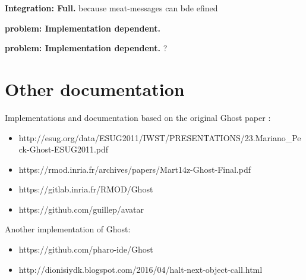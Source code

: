 \documentclass[10pt,twoside,english]{_support/latex/sbabook/sbabook}
\begin{document}
\textbf{Integration: Full.} because meat-messages can bde efined

\textbf{ problem: Implementation dependent.}

\textbf{ problem: Implementation dependent.} ?
\section{Other documentation}
Implementations and documentation based on the original Ghost paper \cite{Mart14z}:

\begin{itemize}
\item http://esug.org/data/ESUG2011/IWST/PRESENTATIONS/23.Mariano\_Peck-Ghost-ESUG2011.pdf
\item https://rmod.inria.fr/archives/papers/Mart14z-Ghost-Final.pdf
\item https://gitlab.inria.fr/RMOD/Ghost
\item https://github.com/guillep/avatar
\end{itemize}

Another implementation of Ghost:

\begin{itemize}
\item https://github.com/pharo-ide/Ghost
\item http://dionisiydk.blogspot.com/2016/04/halt-next-object-call.html
\end{itemize}






\backmatter

\end{document}
